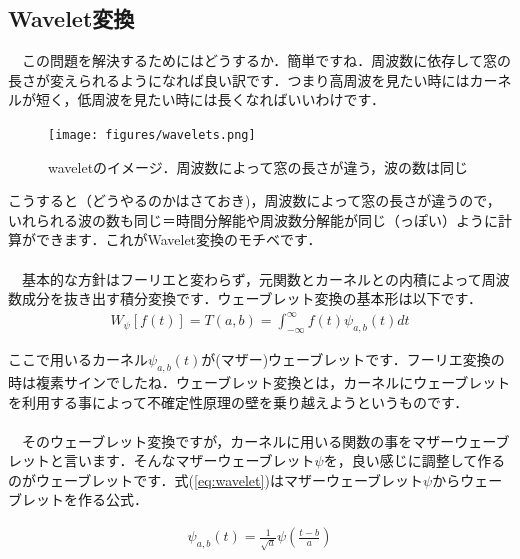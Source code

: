 \documentclass[11pt,a4paper,uplatex]{ujreport} 	%
\begin{document}
\subsection{Wavelet変換}
　この問題を解決するためにはどうするか．簡単ですね．周波数に依存して窓の長さが変えられるようになれば良い訳です．つまり高周波を見たい時にはカーネルが短く，低周波を見たい時には長くなればいいわけです．\\

\begin{figure}[H]
\label{im:wavelets}
  \centering
  \texttt{[image: figures/wavelets.png]}
  \caption{waveletのイメージ．周波数によって窓の長さが違う，波の数は同じ}
\end{figure}

こうすると（どうやるのかはさておき)，周波数によって窓の長さが違うので，いれられる波の数も同じ＝時間分解能や周波数分解能が同じ（っぽい）ように計算ができます．これがWavelet変換のモチベです．\\
\\
　基本的な方針はフーリエと変わらず，元関数とカーネルとの内積によって周波数成分を抜き出す積分変換です．ウェーブレット変換の基本形は以下です．\\

\begin{eqnarray}
W_\psi[f(t)]  = T(a,b) = \int_{-\infty}^{\infty} f(t)\psi_{a,b}(t) dt
\label{eq:wavelet_transform}
\end{eqnarray}

ここで用いるカーネル$\psi_{a,b}(t)$が(マザー)ウェーブレットです．フーリエ変換の時は複素サインでしたね．ウェーブレット変換とは，カーネルにウェーブレットを利用する事によって不確定性原理の壁を乗り越えようというものです．\\
\\
　そのウェーブレット変換ですが，カーネルに用いる関数の事をマザーウェーブレットと言います．そんなマザーウェーブレット$\psi$を，良い感じに調整して作るのがウェーブレットです．式(\ref{eq:wavelet})はマザーウェーブレット$\psi$からウェーブレットを作る公式．

\begin{eqnarray}
\psi_{a,b}(t)  = \frac{1}{\sqrt{a}}\psi(\frac{t-b}{a})
\label{eq:wavelet}
\end{eqnarray}
\end{document}
